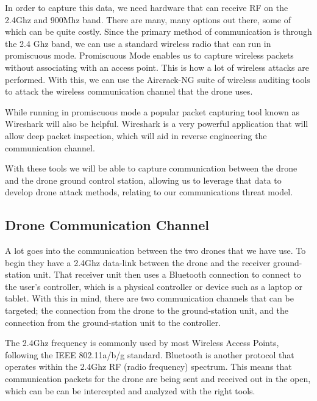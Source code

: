 \documentclass[IEEEtran,letterpaper,10pt,notitlepage,draftclsnofoot,onecolumn]{article}
\begin{document}
In order to capture this data, we need hardware that can receive RF on the 2.4Ghz and 900Mhz band. There are many, many
options out there, some of which can be quite costly. Since the primary method of communication is through the 2.4 Ghz
band, we can use a standard wireless radio that can run in promiscuous mode\cite{WiFiPerc}. Promiscuous Mode enables
us to capture wireless packets without associating with an access point. This is how a lot of wireless attacks are
performed\cite{WiFiPerc}. With this, we can use the Aircrack-NG suite of wireless auditing tools to attack the wireless
communication channel that the drone uses\cite{AircrackNG}.

While running in promiscuous mode a popular packet capturing tool known as Wireshark will also be helpful. Wireshark
is a very powerful application that will allow deep packet inspection, which will aid in reverse engineering the
communication channel\cite{WiFiPerc}.

With these tools we will be able to capture communication between the drone and the drone ground control station, allowing
us to leverage that data to develop drone attack methods, relating to our communications threat model.


\subsection{Drone Communication Channel}
A lot goes into the communication between the two drones that we have use.
To begin they have a 2.4Ghz data-link between the drone and the receiver ground-station unit.
That receiver unit then uses a Bluetooth connection to connect to the user's controller, which is a physical controller
or device such as a laptop or tablet.\cite{NazaM2} With this in mind, there are two communication channels that can be
targeted; the connection from the drone to the ground-station unit, and the connection from the ground-station unit
to the controller\cite{NazaM2}.

The 2.4Ghz frequency is commonly used by most Wireless Access Points, following the IEEE 802.11a/b/g
standard. Bluetooth is another protocol that operates within the 2.4Ghz RF (radio frequency)
spectrum\cite{HakDaSpectrum}. This means that communication packets for the drone are being sent and received out in the
open, which can be can be intercepted and analyzed with the right tools.
\end{document}
